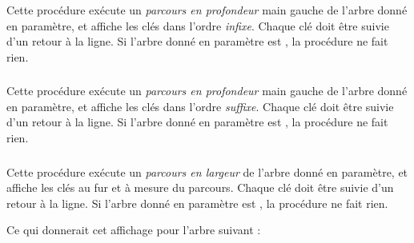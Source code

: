 \vspace*{-0.5cm}

\subsubsection*{}

\noindent Cette procédure exécute un \textit{parcours en profondeur} main gauche de l'arbre donné en paramètre, et affiche les clés dans l'ordre \textit{infixe}.
Chaque clé doit être suivie d'un retour à la ligne.
Si l'arbre donné en paramètre est , la procédure ne fait rien.

\subsubsection*{}

\noindent Cette procédure exécute un \textit{parcours en profondeur} main gauche de l'arbre donné en paramètre, et affiche les clés dans l'ordre \textit{suffixe}.
Chaque clé doit être suivie d'un retour à la ligne.
Si l'arbre donné en paramètre est , la procédure ne fait rien.

\bigskip


\subsubsection*{}

\noindent Cette procédure exécute un \textit{parcours en largeur} de l'arbre donné en paramètre, et affiche les clés au fur et à mesure du parcours.
Chaque clé doit être suivie d'un retour à la ligne.
Si l'arbre donné en paramètre est , la procédure ne fait rien.

\noindent Ce qui donnerait cet affichage pour l'arbre suivant :

